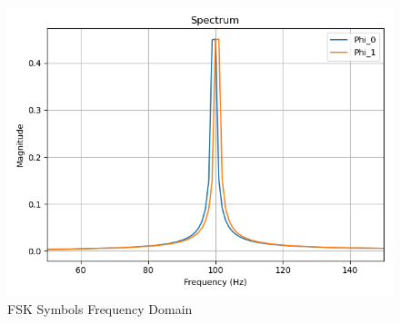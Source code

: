 \documentclass[
	letterpaper, %
	10pt, %
]{CSUniSchoolLabReport}
\begin{document}
\begin{figure}[H] %
	\centering %
	\includegraphics[width=1.2\textwidth]{phi_freq_domain.png} %
	\caption{FSK Symbols Frequency Domain}
	\label{fig:block}
\end{figure}
\end{document}
